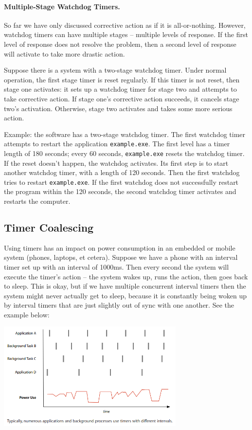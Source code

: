 \paragraph{Multiple-Stage Watchdog Timers.}
So far we have only discussed corrective action as if it is all-or-nothing. However, watchdog timers can have multiple stages -- multiple levels of response. If the first level of response does not resolve the problem, then a second level of response will activate to take more drastic action. 

Suppose there is a system with a two-stage watchdog timer. Under normal operation, the first stage timer is reset regularly. If this timer is not reset, then stage one activates: it sets up a watchdog timer for stage two and attempts to take corrective action. If stage one's corrective action succeeds, it cancels stage two's activation. Otherwise, stage two activates and takes some more serious action.

Example: the software has a two-stage watchdog timer. The first watchdog timer attempts to restart the application \texttt{example.exe}. The first level has a timer length of 180 seconds; every 60 seconds, \texttt{example.exe} resets the watchdog timer. If the reset doesn't happen, the watchdog activates. Its first step is to start another watchdog timer, with a length of 120 seconds. Then the first watchdog tries to restart \texttt{example.exe}. If the first watchdog does not successfully restart the program within the 120 seconds, the second watchdog timer activates and restarts the computer.

\subsection*{Timer Coalescing}

Using timers has an impact on power consumption in an embedded or mobile system (phones, laptops, et cetera). Suppose we have a phone with an interval timer set up with an interval of 1000ms. Then every second the system will execute the timer's action -- the system wakes up, runs the action, then goes back to sleep. This is okay, but if we have multiple concurrent interval timers then the system might never actually get to sleep, because it is constantly being woken up by interval timers that are just slightly out of sync with one another. See the example below:

\begin{center}
	\includegraphics[width=0.7\textwidth]{images/coalesced_before.png}
	\cite{coalesce}
\end{center}

